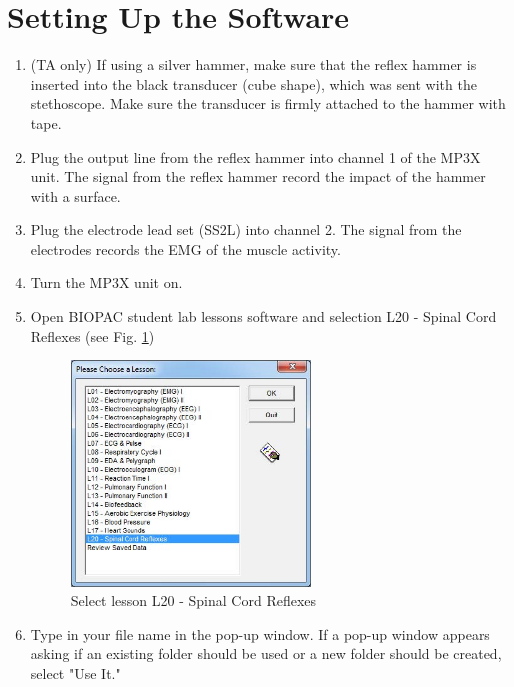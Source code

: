 \documentclass{article}
\begin{document}
\section*{Setting Up the Software}
\begin{enumerate}
	\item (TA only) If using a silver hammer, make sure that the reflex hammer is inserted into the black transducer (cube shape), which was sent with the stethoscope. Make sure the transducer is firmly attached to the hammer with tape.
	\item Plug the output line from the reflex hammer into channel 1 of the MP3X unit. The signal from the reflex hammer record the impact of the hammer with a surface.
	\item Plug the electrode lead set (SS2L) into channel 2. The signal from the electrodes records the EMG of the muscle activity.
	\item Turn the MP3X unit on.
	\item Open BIOPAC student lab lessons	software and selection L20 - Spinal Cord Reflexes (see Fig. \ref{lesson})
	
		\begin{figure}[h]
		\centering
		\includegraphics[width=0.6\textwidth]{../images/EMG_II_3.jpg}	
		\caption{Select lesson L20 - Spinal Cord Reflexes}
		\label{lesson}
		\end{figure}
	
	\item Type in your file name in the pop-up window. If a pop-up window appears asking if an existing folder should be used or a new folder should be created, select "Use It."
\end{enumerate}
\end{document}
